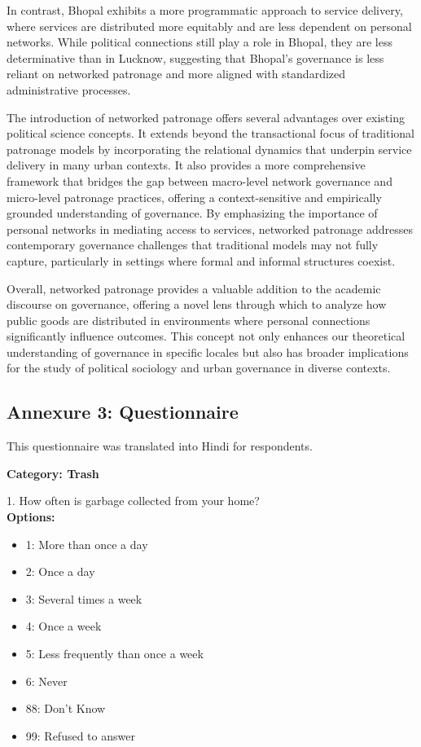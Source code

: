 In contrast, Bhopal exhibits a more programmatic approach to service delivery, where services are distributed more equitably and are less dependent on personal networks. While political connections still play a role in Bhopal, they are less determinative than in Lucknow, suggesting that Bhopal’s governance is less reliant on networked patronage and more aligned with standardized administrative processes.

The introduction of networked patronage offers several advantages over existing political science concepts. It extends beyond the transactional focus of traditional patronage models by incorporating the relational dynamics that underpin service delivery in many urban contexts. It also provides a more comprehensive framework that bridges the gap between macro-level network governance and micro-level patronage practices, offering a context-sensitive and empirically grounded understanding of governance. By emphasizing the importance of personal networks in mediating access to services, networked patronage addresses contemporary governance challenges that traditional models may not fully capture, particularly in settings where formal and informal structures coexist.

Overall, networked patronage provides a valuable addition to the academic discourse on governance, offering a novel lens through which to analyze how public goods are distributed in environments where personal connections significantly influence outcomes. This concept not only enhances our theoretical understanding of governance in specific locales but also has broader implications for the study of political sociology and urban governance in diverse contexts.


\subsection{Annexure 3: Questionnaire}

This questionnaire was translated into Hindi for respondents.

\textbf{Category: Trash}

1. How often is garbage collected from your home? \\
   \textbf{Options:}
   \begin{itemize}
       \item 1: More than once a day
       \item 2: Once a day
       \item 3: Several times a week
       \item 4: Once a week
       \item 5: Less frequently than once a week
       \item 6: Never
       \item 88: Don’t Know
       \item 99: Refused to answer
   \end{itemize}

